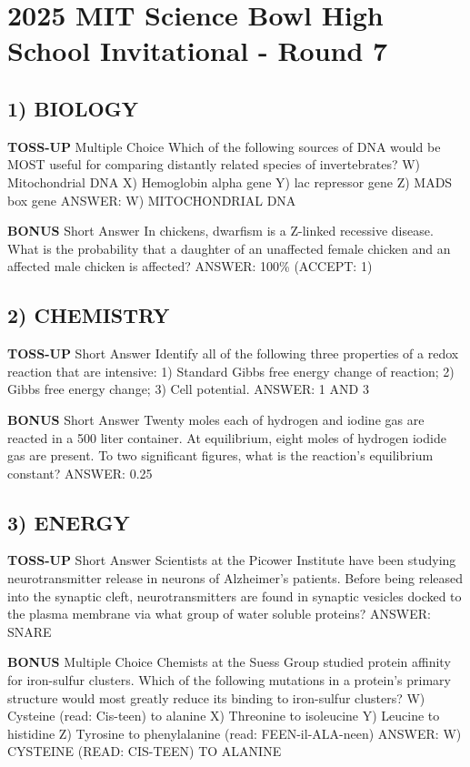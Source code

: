 \documentclass{article}
\begin{document}
\section*{2025 MIT Science Bowl High School Invitational - Round 7}

\subsection*{1) BIOLOGY}
\textbf{TOSS-UP}
Multiple Choice Which of the following sources of DNA would be MOST useful for comparing distantly related species of invertebrates?
W) Mitochondrial DNA
X) Hemoglobin alpha gene
Y) lac repressor gene
Z) MADS box gene
ANSWER: W) MITOCHONDRIAL DNA

\textbf{BONUS}
Short Answer In chickens, dwarfism is a Z-linked recessive disease. What is the probability that a daughter of an unaffected female chicken and an affected male chicken is affected?
ANSWER: 100\% (ACCEPT: 1)

\subsection*{2) CHEMISTRY}
\textbf{TOSS-UP}
Short Answer Identify all of the following three properties of a redox reaction that are intensive: 1) Standard Gibbs free energy change of reaction; 2) Gibbs free energy change; 3) Cell potential.
ANSWER: 1 AND 3

\textbf{BONUS}
Short Answer Twenty moles each of hydrogen and iodine gas are reacted in a 500 liter container. At equilibrium, eight moles of hydrogen iodide gas are present. To two significant figures, what is the reaction's equilibrium constant?
ANSWER: 0.25

\subsection*{3) ENERGY}
\textbf{TOSS-UP}
Short Answer Scientists at the Picower Institute have been studying neurotransmitter release in neurons of Alzheimer's patients. Before being released into the synaptic cleft, neurotransmitters are found in synaptic vesicles docked to the plasma membrane via what group of water soluble proteins?
ANSWER: SNARE

\textbf{BONUS}
Multiple Choice Chemists at the Suess Group studied protein affinity for iron-sulfur clusters. Which of the following mutations in a protein's primary structure would most greatly reduce its binding to iron-sulfur clusters?
W) Cysteine (read: Cis-teen) to alanine
X) Threonine to isoleucine
Y) Leucine to histidine
Z) Tyrosine to phenylalanine (read: FEEN-il-ALA-neen)
ANSWER: W) CYSTEINE (READ: CIS-TEEN) TO ALANINE
\end{document}
